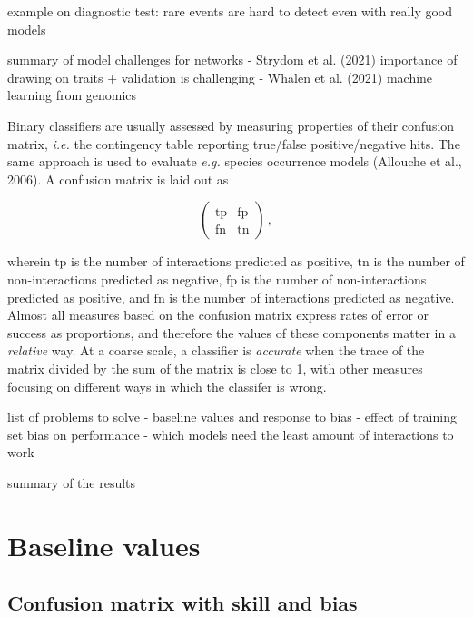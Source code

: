 \documentclass[11pt]{article}
\begin{document}
\vfill

\clearpage
\linenumbers
\pagestyle{normal}

example on diagnostic test: rare events are hard to detect even with
really good models

summary of model challenges for networks - Strydom et al. (2021)
importance of drawing on traits + validation is challenging - Whalen et
al. (2021) machine learning from genomics

Binary classifiers are usually assessed by measuring properties of their
confusion matrix, \emph{i.e.} the contingency table reporting true/false
positive/negative hits. The same approach is used to evaluate
\emph{e.g.} species occurrence models (Allouche et al., 2006). A
confusion matrix is laid out as

\[\begin{pmatrix}
    \text{tp} & \text{fp} \\
    \text{fn} & \text{tn}
\end{pmatrix} \,,\]

wherein \(\text{tp}\) is the number of interactions predicted as
positive, \(\text{tn}\) is the number of non-interactions predicted as
negative, \(\text{fp}\) is the number of non-interactions predicted as
positive, and \(\text{fn}\) is the number of interactions predicted as
negative. Almost all measures based on the confusion matrix express
rates of error or success as proportions, and therefore the values of
these components matter in a \emph{relative} way. At a coarse scale, a
classifier is \emph{accurate} when the trace of the matrix divided by
the sum of the matrix is close to 1, with other measures focusing on
different ways in which the classifer is wrong.

list of problems to solve - baseline values and response to bias -
effect of training set bias on performance - which models need the least
amount of interactions to work

summary of the results

\hypertarget{baseline-values}{%
\section{Baseline values}\label{baseline-values}}

\hypertarget{confusion-matrix-with-skill-and-bias}{%
\subsection{Confusion matrix with skill and
bias}\label{confusion-matrix-with-skill-and-bias}}
\end{document}
